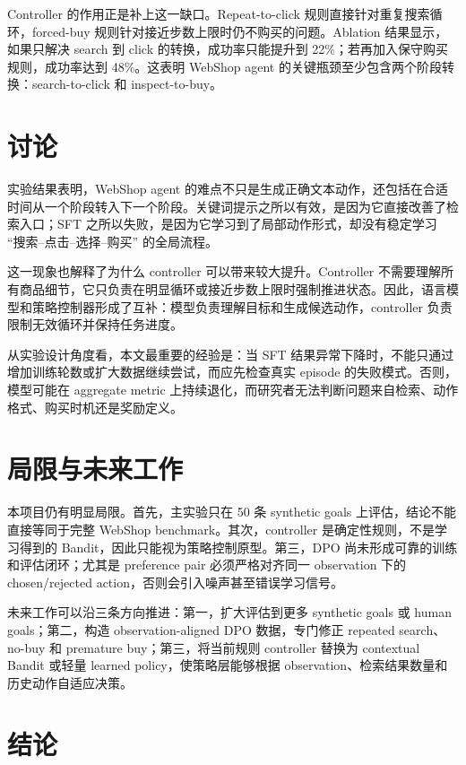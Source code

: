 \documentclass[11pt]{article}
\begin{document}
Controller 的作用正是补上这一缺口。Repeat-to-click 规则直接针对重复搜索循环，forced-buy 规则针对接近步数上限时仍不购买的问题。Ablation 结果显示，如果只解决 search 到 click 的转换，成功率只能提升到 22\%；若再加入保守购买规则，成功率达到 48\%。这表明 WebShop agent 的关键瓶颈至少包含两个阶段转换：search-to-click 和 inspect-to-buy。

\section{讨论}

实验结果表明，WebShop agent 的难点不只是生成正确文本动作，还包括在合适时间从一个阶段转入下一个阶段。关键词提示之所以有效，是因为它直接改善了检索入口；SFT 之所以失败，是因为它学习到了局部动作形式，却没有稳定学习 ``搜索--点击--选择--购买'' 的全局流程。

这一现象也解释了为什么 controller 可以带来较大提升。Controller 不需要理解所有商品细节，它只负责在明显循环或接近步数上限时强制推进状态。因此，语言模型和策略控制器形成了互补：模型负责理解目标和生成候选动作，controller 负责限制无效循环并保持任务进度。

从实验设计角度看，本文最重要的经验是：当 SFT 结果异常下降时，不能只通过增加训练轮数或扩大数据继续尝试，而应先检查真实 episode 的失败模式。否则，模型可能在 aggregate metric 上持续退化，而研究者无法判断问题来自检索、动作格式、购买时机还是奖励定义。

\section{局限与未来工作}

本项目仍有明显局限。首先，主实验只在 50 条 synthetic goals 上评估，结论不能直接等同于完整 WebShop benchmark。其次，controller 是确定性规则，不是学习得到的 Bandit，因此只能视为策略控制原型。第三，DPO 尚未形成可靠的训练和评估闭环；尤其是 preference pair 必须严格对齐同一 observation 下的 chosen/rejected action，否则会引入噪声甚至错误学习信号。

未来工作可以沿三条方向推进：第一，扩大评估到更多 synthetic goals 或 human goals；第二，构造 observation-aligned DPO 数据，专门修正 repeated search、no-buy 和 premature buy；第三，将当前规则 controller 替换为 contextual Bandit 或轻量 learned policy，使策略层能够根据 observation、检索结果数量和历史动作自适应决策。

\section{结论}
\end{document}
